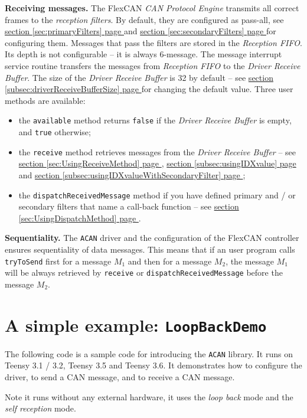 \documentclass[10pt, a4paper, obeyspaces, openany]{extarticle}
\newcommand\refSectionPage[1]{\hyperref[sec:#1]{section \ref*{sec:#1} page \pageref{sec:#1}}}
\newcommand\refSubsectionPage[1]{\hyperref[subsec:#1]{section \ref*{subsec:#1} page \pageref{subsec:#1}}}
\begin{document}
{\bf Receiving messages.} The FlexCAN \emph{CAN Protocol Engine} transmits all correct frames to the \emph{reception filters}. By default, they are configured as pass-all, see \refSectionPage{primaryFilters} and  \refSectionPage{secondaryFilters} for configuring them. Messages that pass the filters are stored in the \emph{Reception FIFO}. Its depth is not configurable -- it is always 6-message. The message interrupt service routine transfers the messages from \emph{Reception FIFO} to the \emph{Driver Receive Buffer}. The size of the \emph{Driver Receive Buffer} is 32 by default -- see \refSubsectionPage{driverReceiveBufferSize} for changing the default value. Three user methods are available:
\begin{itemize}
  \item the \texttt{available} method returns \texttt{false} if the \emph{Driver Receive Buffer} is empty, and \texttt{true} otherwise;
  \item the \texttt{receive} method retrieves messages from the \emph{Driver Receive Buffer} -- see \refSectionPage{UsingReceiveMethod}, \refSubsectionPage{usingIDXvalue} and \refSubsectionPage{usingIDXvalueWithSecondaryFilter};
  \item the \texttt{dispatchReceivedMessage} method if you have defined primary and / or secondary filters that name a call-back function -- see \refSectionPage{UsingDispatchMethod}.
\end{itemize}

{\bf Sequentiality.} The \texttt{ACAN} driver and the configuration of the FlexCAN controller ensures sequentiality of data messages. This means that if an user program calls \texttt{tryToSend} first for a message $M_1$ and then for a message $M_2$, the message $M_1$ will be always retrieved by \texttt{receive} or \texttt{dispatchReceivedMessage} before the message $M_2$.



\section{A simple example: \texttt{LoopBackDemo}}

The following code is a sample code for introducing the \texttt{ACAN} library. It runs on Teensy 3.1 / 3.2, Teensy 3.5 and Teensy 3.6. It demonstrates how to configure the driver, to send a CAN message, and to receive a CAN message.

Note it runs without any external hardware, it uses the \emph{loop back} mode and the \emph{self reception} mode.
\end{document}
